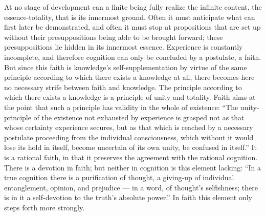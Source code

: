 \documentclass[12pt,a4paper]{book}
\newcommand{\opage}[1]{\marginnote{\footnotesize\textit{[#1]}}}
\begin{document}
At no stage of development can a finite being fully realize the infinite content, the
essence-totality, that is its innermost ground. Often it must anticipate what can first later be
demonstrated, and often it must stop at propositions that are set up without their presuppositions
being able to be brought forward; these presuppositions lie hidden in its innermost essence.
Experience is constantly incomplete, and therefore \opage{203}cognition can only be concluded by a postulate,
a faith. But since this faith is knowledge's self-supplementation by virtue of the same principle
according to which there exists a knowledge at all, there becomes here no necessary strife between
faith and knowledge. The principle according to which there exists a knowledge is a principle of
unity and totality. Faith aims at the point that such a principle has validity in the whole of
existence: ``The unity-principle of the existence not exhausted by experience is grasped not as
that whose certainty experience secures, but as that which is reached by a necessary postulate
proceeding from the individual consciousness, which without it would lose its hold in itself,
become uncertain of its own unity, be confused in itself.'' It is a rational faith, in that it
preserves the agreement with the rational cognition. There is a devotion in faith; but neither in
cognition is this element lacking: ``In a true cognition there is a purification of thought, a
giving-up of individual entanglement, opinion, and prejudice --- in a word, of thought's
selfishness; there is in it a self-devotion to the truth's absolute power.'' In faith this element
only steps forth more strongly.
\end{document}
